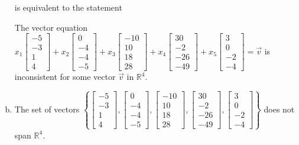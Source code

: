 \begin{exerciseAnswer}
\begin{enumerate}[(a)]
     is equivalent to the statement 
\begin{center}\begin{minipage}{0.8\textwidth}
 The vector equation \( x_{1} \left[\begin{array}{c}
-5 \\
-3 \\
1 \\
4
\end{array}\right] + x_{2} \left[\begin{array}{c}
0 \\
-4 \\
-4 \\
-5
\end{array}\right] + x_{3} \left[\begin{array}{c}
-10 \\
10 \\
18 \\
28
\end{array}\right] + x_{4} \left[\begin{array}{c}
30 \\
-2 \\
-26 \\
-49
\end{array}\right] + x_{5} \left[\begin{array}{c}
3 \\
0 \\
-2 \\
-4
\end{array}\right] =\vec{v}\) is inconsistent for some vector \(\vec{v}\) in \(\mathbb{R}^4\). 
\end{minipage}\end{center}
    
\item  The set of vectors \( \left\{ \left[\begin{array}{c}
-5 \\
-3 \\
1 \\
4
\end{array}\right] , \left[\begin{array}{c}
0 \\
-4 \\
-4 \\
-5
\end{array}\right] , \left[\begin{array}{c}
-10 \\
10 \\
18 \\
28
\end{array}\right] , \left[\begin{array}{c}
30 \\
-2 \\
-26 \\
-49
\end{array}\right] , \left[\begin{array}{c}
3 \\
0 \\
-2 \\
-4
\end{array}\right] \right\} \) does not span \(\mathbb{R}^4\). 
\end{enumerate}
    
\end{exerciseAnswer}
    
